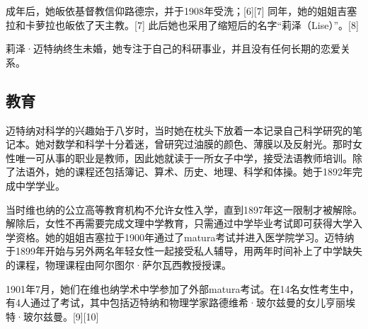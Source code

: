 成年后，她皈依基督教信仰路德宗，并于1908年受洗；[6][7] 同年，她的姐姐吉塞拉和卡萝拉也皈依了天主教。[7] 此后她也采用了缩短后的名字“莉泽（Lise）”。[8]

莉泽·迈特纳终生未婚，她专注于自己的科研事业，并且没有任何长期的恋爱关系。
\subsection{教育}
迈特纳对科学的兴趣始于八岁时，当时她在枕头下放着一本记录自己科学研究的笔记本。她对数学和科学十分着迷，曾研究过油膜的颜色、薄膜以及反射光。那时女性唯一可从事的职业是教师，因此她就读于一所女子中学，接受法语教师培训。除了法语外，她的课程还包括簿记、算术、历史、地理、科学和体操。她于1892年完成中学学业。

当时维也纳的公立高等教育机构不允许女性入学，直到1897年这一限制才被解除。解除后，女性不再需要完成文理中学教育，只需通过中学毕业考试即可获得大学入学资格。她的姐姐吉塞拉于1900年通过了matura考试并进入医学院学习。迈特纳于1899年开始与另外两名年轻女性一起接受私人辅导，用两年时间补上了中学缺失的课程，物理课程由阿尔图尔·萨尔瓦西教授授课。

1901年7月，她们在维也纳学术中学参加了外部matura考试。在14名女性考生中，有4人通过了考试，其中包括迈特纳和物理学家路德维希·玻尔兹曼的女儿亨丽埃特·玻尔兹曼。[9][10]
